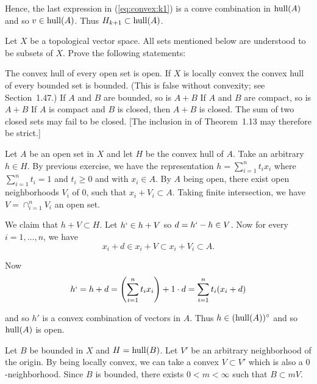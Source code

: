 \begin{enumerate}
Hence, the last expression in (\ref{eq:convex:k1}) is a conve combination
in \(\mathop{\rm hull}\nolimits(A)\) and so \(v\in \mathop{\rm hull}\nolimits(A)\).
Thus \(H_{k+1}\subset \mathop{\rm hull}\nolimits(A)\).




\begin{excopy}
Let $X$ be a topological vector space. All sets mentioned below
are understood to be subsets of $X$. Prove the following statements:
\begin{itemize}
 The convex hull of every open set is open.
   If $X$ is locally convex the convex hull of every bounded set is bounded.
   (This is false without convexity; see Section~1.47.)
  If $A$ and $B$ are bounded, so is \(A+B\)
  If $A$ and $B$ are compact, so is \(A+B\)
  If $A$ is compact and $B$ is closed, then \(A+B\) is closed.
   The sum of two closed sets may fail to be closed.
   [The inclusion in  of Theorem~1.13 may therefore be strict.]
\end{itemize}
\end{excopy}

\begin{itemize}
   Let $A$ be an open set in $X$ and let $H$ be the convex hull of $A$.
   Take an arbitrary \(h\in H\). 
   By previous exercise, we have the representation
   \(h = \sum_{i=1}^n t_i x_i\) 
   where \(\sum_{i=1}^n t_i = 1\) and \(t_i\geq 0\) and with \(x_i\in A\).
   By $A$ being open, there exist
   open neighborhoods  \(V_i\) of $0$, such that \(x_i + V_i \subset A\).
   Taking finite intersection, we have \(V = \cap_{i=1}^n V_i\) an open set.

   We claim that \(h + V \subset H\).
   Let \(h` \in h+V\) so \(d = h`-h\in V\).
   Now for every \(i=1,\ldots,n\), we have
   \begin{equation*}
   x_i + d \in x_i+V \subset x_i+V_i \subset A.
   \end{equation*}

   Now 
   \begin{equation*}
   h` = h + d = \left(\sum_{i=1}^n t_i x_i\right) + 1\cdot d \\
      = \sum_{i=1}^n t_i (x_i + d) \\
   \end{equation*}

   and so \(h'\) is a convex combination of vectors in $A$.
   Thus \(h\in (\mathop{\rm hull}\nolimits(A))^{\circ}\) and so \(\mathop{\rm hull}\nolimits(A)\) is open.

   Let $B$ be bounded in $X$ and \(H = \mathop{\rm hull}\nolimits(B)\).
   Let $V'$ be an arbitrary neighborhood of the origin.
   By being locally convex, we can take a convex \(V\subset V'\) 
   which is also a $0$-neighborhood.
   Since $B$ is bounded, there exists \(0 < m < \infty\) such that
   \(B\subset mV\).


\end{itemize}
\end{enumerate}
